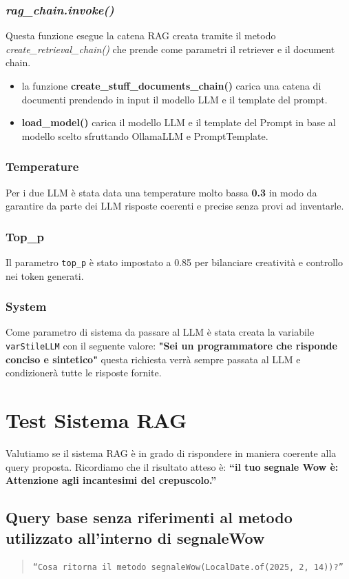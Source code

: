 \documentclass[12pt,a4paper,openright,twoside]{book}
\begin{document}
\subsubsection{\emph{rag\_chain.invoke()}}
 Questa funzione esegue la catena RAG creata tramite il metodo \emph{create\_retrieval\_chain()} che prende come parametri il retriever e il document chain.
 \begin{itemize}
    \item la funzione \textbf{create\_stuff\_documents\_chain()} carica una catena di documenti prendendo in input il modello LLM e il template del prompt.
    \item \textbf{load\_model()} carica il modello LLM e il template del Prompt in base al modello scelto sfruttando OllamaLLM e PromptTemplate.
 \end{itemize}
 \subsubsection{Temperature}
Per i due LLM è stata data una temperature molto bassa \textbf{0.3} in modo da garantire da parte dei LLM risposte coerenti e precise senza provi ad inventarle.
\subsubsection{Top\_p}
Il parametro \texttt{top\_p} è stato impostato a 0.85 per bilanciare creatività e controllo nei token generati.
\subsubsection{System}
Come parametro di sistema da passare al LLM è stata creata la variabile \texttt{varStileLLM} con il seguente valore: \textbf{"Sei un programmatore che risponde conciso e sintetico"}
questa richiesta verrà sempre passata al LLM e condizionerà tutte le risposte fornite.

\section{Test Sistema RAG}
Valutiamo se il sistema RAG  è in grado di rispondere in maniera coerente alla query proposta.
Ricordiamo che il risultato atteso è: \textbf{``il tuo segnale Wow è: Attenzione agli incantesimi del crepuscolo.''}    
\subsection{Query base senza riferimenti al metodo utilizzato all'interno di segnaleWow}
\begin{quote}
    \texttt{``Cosa ritorna il metodo segnaleWow(LocalDate.of(2025, 2, 14))?''}
\end{quote}
\end{document}
